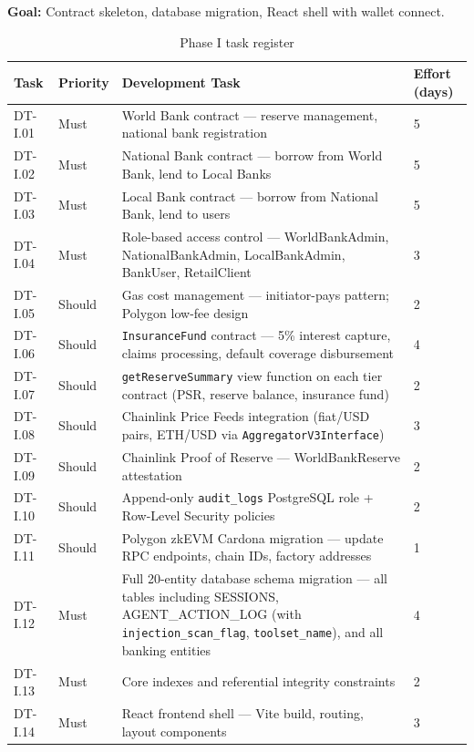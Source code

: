 \documentclass[12pt, a4paper]{report}
\newcommand{\tableheadcolor}{\rowcolor{TableHeadBg}}
\begin{document}
\textbf{Goal:} Contract skeleton, database migration, React shell with wallet connect.

\begin{table}[H]
\centering
\caption[Phase I task register]{Phase I task register}
\label{tab:phaseI-contracts}
\small
\begin{tabular}{p{1.8cm}p{1.8cm}p{7.5cm}p{1.5cm}}
\toprule
\tableheadcolor
\textbf{Task} & \textbf{Priority} & \textbf{Development Task} & \textbf{Effort (days)} \\
\midrule
DT-I.01 & Must & World Bank contract --- reserve management, national bank registration & 5 \\
DT-I.02 & Must & National Bank contract --- borrow from World Bank, lend to Local Banks & 5 \\
DT-I.03 & Must & Local Bank contract --- borrow from National Bank, lend to users & 5 \\
DT-I.04 & Must & Role-based access control --- WorldBankAdmin, NationalBankAdmin, LocalBankAdmin, BankUser, RetailClient & 3 \\
DT-I.05 & Should & Gas cost management --- initiator-pays pattern; Polygon low-fee design & 2 \\
DT-I.06 & Should & \texttt{InsuranceFund} contract --- 5\% interest capture, claims processing, default coverage disbursement & 4 \\
DT-I.07 & Should & \texttt{getReserveSummary} view function on each tier contract (PSR, reserve balance, insurance fund) & 2 \\
DT-I.08 & Should & Chainlink Price Feeds integration (fiat/USD pairs, ETH/USD via \texttt{AggregatorV3Interface}) & 3 \\
DT-I.09 & Should & Chainlink Proof of Reserve --- WorldBankReserve attestation & 2 \\
DT-I.10 & Should & Append-only \texttt{audit\_logs} PostgreSQL role + Row-Level Security policies & 2 \\
DT-I.11 & Should & Polygon zkEVM Cardona migration --- update RPC endpoints, chain IDs, factory addresses & 1 \\
DT-I.12 & Must & Full 20-entity database schema migration --- all tables including SESSIONS, AGENT\_ACTION\_LOG (with \texttt{injection\_scan\_flag}, \texttt{toolset\_name}), and all banking entities & 4 \\
DT-I.13 & Must & Core indexes and referential integrity constraints & 2 \\
DT-I.14 & Must & React frontend shell --- Vite build, routing, layout components & 3 \\

\end{tabular}
\end{table}
\end{document}
